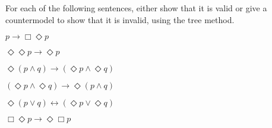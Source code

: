 \begin{exercise}
  For each of the following sentences, either show that it is valid or
  give a countermodel to show that it is invalid, using the tree method.
  \begin{exlist}
  \item $p \to \Box\Diamond p$
  \item $\Diamond\Diamond p \to \Diamond p$
  \item $\Diamond(p \land q) \to (\Diamond p \land \Diamond q)$
  \item $(\Diamond p \land \Diamond q) \to \Diamond(p \land q)$
  \item $\Diamond(p \lor q) \leftrightarrow (\Diamond p \lor \Diamond q)$
  \item $\Box\Diamond p \to \Diamond\Box p$
  \end{exlist}
\end{exercise}
